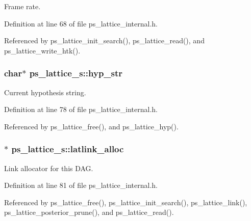 Frame rate. 



Definition at line 68 of file ps\-\_\-lattice\-\_\-internal.\-h.



Referenced by ps\-\_\-lattice\-\_\-init\-\_\-search(), ps\-\_\-lattice\-\_\-read(), and ps\-\_\-lattice\-\_\-write\-\_\-htk().

\subsubsection[{hyp\-\_\-str}]{\setlength{\rightskip}{0pt plus 5cm}char$\ast$ ps\-\_\-lattice\-\_\-s\-::hyp\-\_\-str}\label{structps__lattice__s_ac3844c69f8393b607047bd9b302b979a}


Current hypothesis string. 



Definition at line 78 of file ps\-\_\-lattice\-\_\-internal.\-h.



Referenced by ps\-\_\-lattice\-\_\-free(), and ps\-\_\-lattice\-\_\-hyp().

\subsubsection[{latlink\-\_\-alloc}]{$\ast$ ps\-\_\-lattice\-\_\-s\-::latlink\-\_\-alloc}\label{structps__lattice__s_afa8ca535dc8bf2cc656f6ad477e13b9f}


Link allocator for this D\-A\-G. 



Definition at line 81 of file ps\-\_\-lattice\-\_\-internal.\-h.



Referenced by ps\-\_\-lattice\-\_\-free(), ps\-\_\-lattice\-\_\-init\-\_\-search(), ps\-\_\-lattice\-\_\-link(), ps\-\_\-lattice\-\_\-posterior\-\_\-prune(), and ps\-\_\-lattice\-\_\-read().

